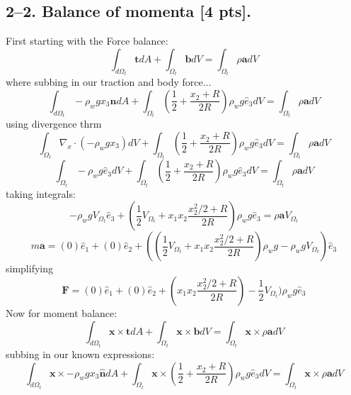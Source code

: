 \subsection*{2--2. \textbf{Balance of momenta} [4 pts].} 
First starting with the Force balance:
\begin{equation}
    \int_{d\Omega_t}\bm{t}dA+\int_{\Omega_t}\bm{b}dV = \int_{\Omega_t}\rho \bm{a}dV
\end{equation}
where subbing in our traction and body force...
\begin{equation}
    \int_{d\Omega_t}-\rho_w g x_3 \hat{\bm{n}}dA+\int_{\Omega_t} (\frac{1}{2}+\frac{x_2+R}{2R})\rho_w g \hat{e}_3  dV = \int_{\Omega_t}\rho \bm{a}dV
\end{equation}
using divergence thrm
\begin{equation}
    \int_{\Omega_t}\nabla_x\cdot(-\rho_w g x_3) dV+\int_{\Omega_t} (\frac{1}{2}+\frac{x_2+R}{2R})\rho_w g \hat{e}_3  dV = \int_{\Omega_t}\rho \bm{a}dV
\end{equation}
\begin{equation}
    \int_{\Omega_t}-\rho_w g\hat{e}_3 dV+\int_{\Omega_t} (\frac{1}{2}+\frac{x_2+R}{2R})\rho_w g \hat{e}_3  dV = \int_{\Omega_t}\rho \bm{a}dV
\end{equation}
taking integrals:
\begin{equation}
    -\rho_w gV_{\Omega_t}\hat{e}_3 + (\frac{1}{2}V_{\Omega_t}+x_1x_2\frac{x_2^2/2+R}{2R})\rho_w g \hat{e}_3 = \rho \bm{a} V_{\Omega_t}
\end{equation}
\begin{equation}
    m\bm{a} = (0)\hat{e}_1 + (0)\hat{e}_2 + ((\frac{1}{2}V_{\Omega_t}+x_1x_2\frac{x_2^2/2+R}{2R})\rho_w g-\rho_w gV_{\Omega_t})\hat{e}_3
\end{equation}
simplifying
\begin{equation}
    \boxed{\bm{F} = (0)\hat{e}_1 + (0)\hat{e}_2 + (x_1x_2\frac{x_2^2/2+R}{2R})-\frac{1}{2}V_{\Omega_t})\rho_w g\hat{e}_3}
\end{equation}
Now for moment balance:
\begin{equation}
    \int_{d\Omega_t}\bm{x}\times\bm{t}dA+\int_{\Omega_t}\bm{x}\times\bm{b}dV = \int_{\Omega_t}\bm{x}\times\rho \bm{a}dV
\end{equation}
subbing in our known expressions:
\begin{equation}
    \int_{d\Omega_t}\bm{x}\times-\rho_w g x_3 \hat{\bm{n}}dA+\int_{\Omega_t}\bm{x}\times(\frac{1}{2}+\frac{x_2+R}{2R})\rho_w g \hat{e}_3dV = \int_{\Omega_t}\bm{x}\times\rho \bm{a}dV
\end{equation}
